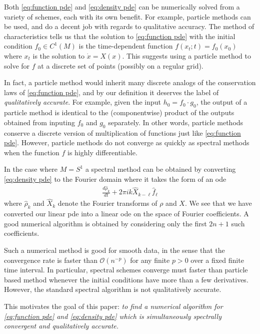 \documentclass[final,leqno]{siamltex1213}
\begin{document}
Both \eqref{eq:function pde} and \eqref{eq:density pde} can be numerically solved from a variety of schemes, each with its own benefit.
For example, particle methods can be used, and do a decent job with regards to qualitative accuracy.
The method of characteristics tells us that
the solution to \eqref{eq:function pde} with the initial condition $f_{0} \in C^{1}(M)$ is the time-dependent function $f( x_{t} ;t) = f_{0}( x_{0} )$ where $x_{t}$ is the solution to $\dot{x} = X(x)$.
This suggests using a particle method to solve for $f$ at a discrete set of points (possibly on a regular grid).
 
In fact, a particle method would inherit many discrete analogs of the conservation laws of \eqref{eq:function pde},
and by our definition it deserves the label of \emph{qualitatively accurate}.
For example, given the input $h_{0} = f_{0} \cdot g_{0}$, the output of a particle method is identical to the (componentwise) product of the outputs obtained from inputing $f_{0}$ and $g_{0}$ separately.
In other words, particle methods conserve a discrete version of multiplication of functions just like \eqref{eq:function pde}.
However, particle methods do not converge as quickly as spectral methods when the function $f$ is highly differentiable.

In the case where $M=S^{1}$ a spectral method can be obtained by converting \eqref{eq:density pde} to the Fourier domain where it takes the form
of an ode
\begin{align}
	\frac{d \hat{\rho}_{k}}{dt} + 2\pi i k  \widehat{X}_{k-\ell} \hat{f}_{\ell} \label{eq:standard spectral}
\end{align}
where $\hat{\rho}_{k}$ and $\widehat{X}_{k}$ denote the Fourier transforms of $\rho$ and $X$.
We see that we have converted our linear pde into a linear ode on the space of Fourier coefficients.
A good numerical algorithm is obtained by considering only the first $2n+1$ such coefficients.

Such a numerical method is good for smooth data, in the sense that the convergence rate is faster than $\mathcal{O}(n^{-p})$ for any finite $p > 0$ over a fixed finite time interval.
In particular, spectral schemes converge must faster than particle based method whenever the initial conditions have more than a few derivatives.
However, the standard spectral algorithm is not qualitatively accurate.

This motivates the goal of this paper:
\emph{to find a numerical algorithm for \eqref{eq:function pde} and \eqref{eq:density pde} which is simultaneously spectrally convergent and qualitatively accurate.}
\end{document}
